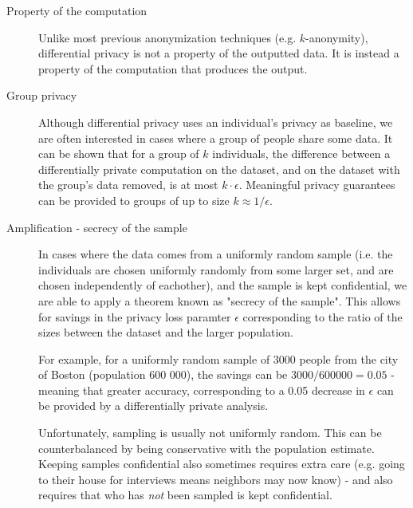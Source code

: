 \documentclass[a4paper]{article}
\begin{document}
\begin{description}
    \item[Property of the computation] Unlike most previous anonymization techniques (e.g. $k$-anonymity), differential privacy is not a property of the outputted data. It is instead a property of the computation that produces the output.
    
    \item[Group privacy] Although differential privacy uses an individual's privacy as baseline, we are often interested in cases where a group of people share some data. It can be shown that for a group of $k$ individuals, the difference between a differentially private computation on the dataset, and on the dataset with the group's data removed, is at most $k\cdot\epsilon$. Meaningful privacy guarantees can be provided to groups of up to size $k \approx 1/\epsilon.$
    
    \item[Amplification - secrecy of the sample] In cases where the data comes from a uniformly random sample (i.e. the individuals are chosen uniformly randomly from some larger set, and are chosen independently of eachother), and the sample is kept confidential, we are able to apply a theorem known as "secrecy of the sample". This allows for savings in the privacy loss paramter $\epsilon$ corresponding to the ratio of the sizes between the dataset and the larger population.
    
    For example, for a uniformly random sample of 3000 people from the city of Boston (population 600 000), the savings can be $3000/600000 = 0.05$ - meaning that greater accuracy, corresponding to a 0.05 decrease in $\epsilon$ can be provided by a differentially private analysis.
    
    Unfortunately, sampling is usually not uniformly random. This can be counterbalanced by being conservative with the population estimate. Keeping samples confidential also sometimes requires extra care (e.g. going to their house for interviews means neighbors may now know) - and also requires that who has \textit{not} been sampled is kept confidential.
\end{description}
\end{document}
